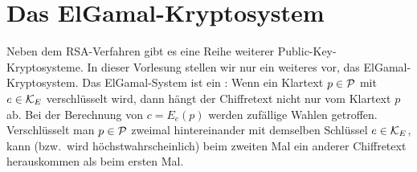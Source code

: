% 
% 
%  
%  
% 
% 
% 

\section{Das ElGamal-Kryptosystem}

Neben dem RSA-Verfahren gibt es eine Reihe weiterer Public-Key-Kryptosysteme. In dieser Vorlesung stellen wir nur ein weiteres vor, das ElGamal-Kryptosystem. Das ElGamal-System ist ein : Wenn ein Klartext $p \in \mathcal P$ mit $e \in \mathcal K_E$ verschlüsselt wird, dann hängt der Chiffretext nicht nur vom Klartext $p$ ab. Bei der Berechnung von $c = E_e(p)$ werden zufällige Wahlen getroffen. Verschlüsselt man $p \in \mathcal P$ zweimal hintereinander mit demselben Schlüssel $e \in \mathcal K_E$, kann (bzw.~wird höchstwahrscheinlich) beim zweiten Mal ein anderer Chiffretext herauskommen als beim ersten Mal.

